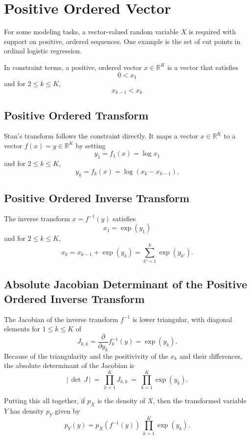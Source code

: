 \documentclass[10pt]{report}
\newcommand{\Stan}{Stan\xspace}
\newcommand{\reals}{\mathbb{R}}
\begin{document}
\section{Positive Ordered Vector}

For some modeling tasks, a vector-valued random variable $X$ is
required with support on positive, ordered sequences.  One example is
the set of cut points in ordinal logistic regression.  

In constraint terms, a positive, ordered vector $x \in \reals^K$
is a vector that satisfies
\[
0 < x_1
\]
%
and for $2 \leq k \leq K$,
\[
x_{k-1} < x_k
\]
%

\subsection{Positive Ordered Transform}

\Stan's transform follows the constraint directly.  It maps a vector
$x \in \reals^{K}$ to a vector $f(x) = y \in \reals^K$ by setting
%
\[
y_1 = f_1(x) = \log x_1
\] 
%
and for $2 \leq k \leq K$,
\[
y_k = f_k(x) = \log \left( x_{k} - x_{k-1} \right).
\]

\subsection{Positive Ordered Inverse Transform}

The inverse transform $x = f^{-1}(y)$ satisfies
%
\[
x_1 = \exp(y_1)
\]
%
and for $2 \leq k \leq K$, 
\[
x_k = x_{k-1} + \exp(y_k) = \sum_{k' =1}^{k} \exp(y_{k'}).
\]

\subsection{Absolute Jacobian Determinant of the Positive Ordered
  Inverse Transform}

The Jacobian of the inverse transform $f^{-1}$ is lower triangular,
with diagonal elements for $1 \leq k \leq K$ of
\[
J_{k,k} = \frac{\partial}{\partial y_k} f_k^{-1}(y) = \exp(y_k).
\]
%
Because of the triangularity and the positivivity of the $x_k$ and
their differences, the absolute determinant of the Jacobian is
%
\[
\left| \, \det \, J \, \right|
\ = \ 
\prod_{k=1}^K J_{k,k}
\ = \ 
\prod_{k=1}^K \exp(y_k).
\]


Putting this all together, if $p_X$ is the density of $X$, then the
transformed variable $Y$ has density $p_Y$ given by
%
\[
p_Y(y)
= p_X(f^{-1}(y)) 
\
\prod_{k=1}^K \exp(y_k).
\]
\end{document}
